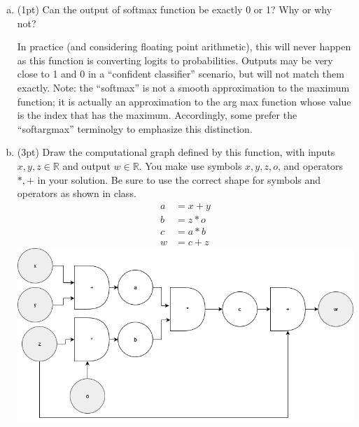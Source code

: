 \documentclass{article}
\begin{document}
\begin{enumerate}[(a)]
  \item (1pt) Can the output of softmax function be exactly 0 or 1? Why or why not?
        \begin{tcolorbox}
          In practice (and considering floating point arithmetic), this will never happen as this function is converting logits to probabilities.
          Outputs may be very close to 1 and 0 in a ``confident classifier'' scenario, but will not match them exactly. Note: the ``softmax'' is not a smooth approximation
          to the maximum function; it is actually an approximation to the arg max function whose value is the index
          that has the maximum. Accordingly, some prefer the ``softargmax'' terminolgy to emphasize this distinction.
        \end{tcolorbox}

  \item (3pt) Draw the computational graph defined by this function, with inputs $x, y, z \in \mathbb{R}$ and output $w\in\mathbb{R}$.
        You make use symbols $x, y, z, o$, and operators $*, +$ in your solution.
        Be sure to use the correct shape for symbols and operators as shown in class.
        \begin{align*}
          a & = x + y \\
          b & = z * o \\
          c & = a * b \\
          w & = c + z
        \end{align*}
        \includegraphics[width=15cm]{diagram2.png}

        \newpage


\end{enumerate}
\end{document}
